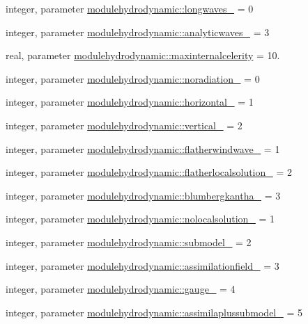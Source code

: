 \begin{DoxyCompactItemize}
integer, parameter \mbox{\hyperlink{namespacemodulehydrodynamic_afbe1f8eb9cfc7c071c049f6ac349fd18}{modulehydrodynamic\+::longwaves\+\_\+}} = 0
\item 
integer, parameter \mbox{\hyperlink{namespacemodulehydrodynamic_a7b25a5daf5e06e631e33916152f8f8da}{modulehydrodynamic\+::analyticwaves\+\_\+}} = 3
\item 
real, parameter \mbox{\hyperlink{namespacemodulehydrodynamic_a3f051f5fd886733770b855f1afdda6f5}{modulehydrodynamic\+::maxinternalcelerity}} = 10.
\item 
integer, parameter \mbox{\hyperlink{namespacemodulehydrodynamic_aefcd852a9a3726b9de7cc774ff3b63c4}{modulehydrodynamic\+::noradiation\+\_\+}} = 0
\item 
integer, parameter \mbox{\hyperlink{namespacemodulehydrodynamic_aff08683bf75b6e58f88d991bf6de6fc6}{modulehydrodynamic\+::horizontal\+\_\+}} = 1
\item 
integer, parameter \mbox{\hyperlink{namespacemodulehydrodynamic_ab1157985a2a599fa0fe1de995f09acb0}{modulehydrodynamic\+::vertical\+\_\+}} = 2
\item 
integer, parameter \mbox{\hyperlink{namespacemodulehydrodynamic_afe0c2581319a871292849ef0d657414f}{modulehydrodynamic\+::flatherwindwave\+\_\+}} = 1
\item 
integer, parameter \mbox{\hyperlink{namespacemodulehydrodynamic_a80d3e90e0672cce41d27250b2bd218c1}{modulehydrodynamic\+::flatherlocalsolution\+\_\+}} = 2
\item 
integer, parameter \mbox{\hyperlink{namespacemodulehydrodynamic_a1d590de331d3d84fae20e05e304bbd34}{modulehydrodynamic\+::blumbergkantha\+\_\+}} = 3
\item 
integer, parameter \mbox{\hyperlink{namespacemodulehydrodynamic_acb9771c6b07326240c8f99f13011cdf9}{modulehydrodynamic\+::nolocalsolution\+\_\+}} = 1
\item 
integer, parameter \mbox{\hyperlink{namespacemodulehydrodynamic_a64e6442e629019f176edce6ad54346e0}{modulehydrodynamic\+::submodel\+\_\+}} = 2
\item 
integer, parameter \mbox{\hyperlink{namespacemodulehydrodynamic_a1440e2f034274469fdc93195249c9b56}{modulehydrodynamic\+::assimilationfield\+\_\+}} = 3
\item 
integer, parameter \mbox{\hyperlink{namespacemodulehydrodynamic_a50f71f62021125375c2ed0d192e573fa}{modulehydrodynamic\+::gauge\+\_\+}} = 4
\item 
integer, parameter \mbox{\hyperlink{namespacemodulehydrodynamic_aa3e99181d5aa9739fba1c4a38373b84c}{modulehydrodynamic\+::assimilaplussubmodel\+\_\+}} = 5

\end{DoxyCompactItemize}
